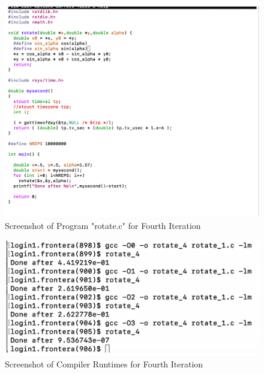 \documentclass{article}
\begin{document}
\begin{figure}[ht]
    \centering
\includegraphics[scale=0.20]{graphics_hw4/rotate_c_fourth_iteration.png}
    \caption{Screenshot of Program "rotate.c" for Fourth Iteration}
    \label{fig:my_label}
\end{figure}
\pagebreak


\begin{figure}[!h]
    \centering
\includegraphics[scale=0.20]{graphics_hw4/compilation_runtimes_fourth_iteration.png}
    \caption{Screenshot of Compiler Runtimes for Fourth Iteration}
    \label{fig:my_label}
\end{figure}
\pagebreak

\end{document}

